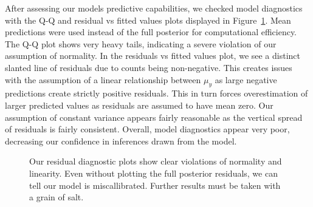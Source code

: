 \documentclass[
  12pt,
  letterpaper,
  DIV=11,
  numbers=noendperiod]{scrartcl}
\begin{document}
After assessing our models predictive capabilities, we checked model
diagnostics with the Q-Q and residual vs fitted values plots displayed
in Figure~\ref{fig-qq}. Mean predictions were used instead of the full
posterior for computational efficiency. The Q-Q plot shows very heavy
tails, indicating a severe violation of our assumption of normality. In
the residuals vs fitted values plot, we see a distinct slanted line of
residuals due to counts being non-negative. This creates issues with the
assumption of a linear relationship between \(\mu_{y}\) as large
negative predictions create strictly positive residuals. This in turn
forces overestimation of larger predicted values as residuals are
assumed to have mean zero. Our assumption of constant variance appears
fairly reasonable as the vertical spread of residuals is fairly
consistent. Overall, model diagnostics appear very poor, decreasing our
confidence in inferences drawn from the model.

\begin{figure}[H]


\caption{\label{fig-qq}Our residual diagnostic plots show clear
violations of normality and linearity. Even without plotting the full
posterior residuals, we can tell our model is miscallibrated. Further
results must be taken with a grain of salt.}

\end{figure}%
\end{document}

